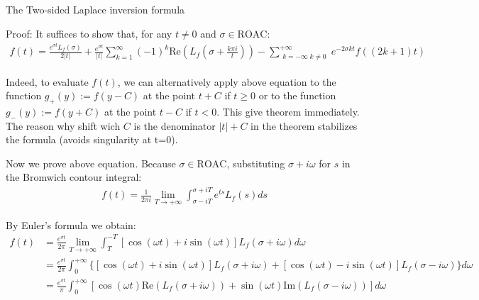 \documentclass{beamer}
\begin{document}
\begin{frame}{The Two-sided Laplace inversion formula}


    {\footnotesize \scriptsize
    \par Proof:  It suffices to show that, for any \( t \neq 0 \) and \(\sigma \in \text{ROAC}\):
    \begin{align*}
        f(t) = \frac{e^{\sigma t} L_f(\sigma)}{2|t|} + \frac{e^{\sigma t}}{|t|} 
\sum_{k=1}^{\infty} (-1)^k \text{Re} \left( L_f \left( \sigma + \frac{k\pi i}{t} \right) \right) 
- \sum_{\substack{k=-\infty\; k\neq 0}}^{+\infty} e^{-2\sigma kt} f((2k+1)t)
    \end{align*}
    \par  Indeed, to evaluate \( f(t) \), we can alternatively apply above equation to the function \( g_+(y) := f(y - C) \) at 
    the point \( t + C \) if \( t \geq 0 \) or 
    to the function \( g_-(y) := f(y + C) \) at the point \( t - C \) if \( t < 0 \). This give theorem immediately. The reason why shift wich $C$ 
    is the denominator $|t|+C$ in the theorem stabilizes the formula (avoids singularity at t=0).
    \par Now we prove above equation. Because \(\sigma \in \text{ROAC}\), substituting \(\sigma + i\omega\) for \( s \) in 
    the Bromwich contour integral:
    \vspace{-1em}
    \begin{align*}
        f(t) = \frac{1}{2\pi i} \lim_{T \to +\infty} \int_{\sigma-iT}^{\sigma+iT} e^{ts} L_f(s)  ds
    \end{align*}
    \par By Euler's formula we obtain:
    \begin{align*}
         f(t) & =\frac{e^{\sigma t}}{2\pi} \lim_{T \to +\infty}
          \int_{T}^{-T} [\cos(\omega t) + i \sin(\omega t)] L_f(\sigma + i\omega)  d\omega\\
          &=\frac{e^{\sigma t}}{2\pi} \int_{0}^{+\infty} \{[\cos(\omega t) 
          + i \sin(\omega t)] L_f(\sigma + i\omega) + [\cos(\omega t) - i \sin(\omega t)] L_f(\sigma - i\omega)\}  d\omega\\
          & = \frac{e^{\sigma t}}{\pi} \int_{0}^{+\infty} [\cos(\omega t) \text{Re}(L_f(\sigma + i\omega)) 
          + \sin(\omega t) \text{Im}(L_f(\sigma - i\omega))]  d\omega
    \end{align*}
    }
    
\end{frame}
\end{document}
